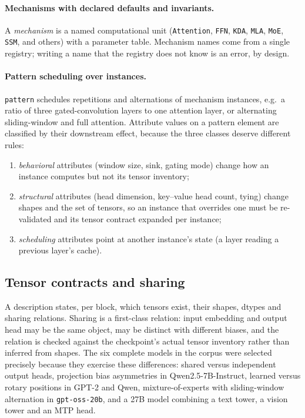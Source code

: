 \documentclass[11pt,a4paper]{article}
\newcommand{\code}[1]{\texttt{#1}}
\begin{document}
\paragraph{Mechanisms with declared defaults and invariants.}
A \emph{mechanism} is a named computational unit (\code{Attention},
\code{FFN}, \code{KDA}, \code{MLA}, \code{MoE}, \code{SSM}, and others) with a
parameter table. Mechanism names come from a single registry; writing a name
that the registry does not know is an error, by design.

\paragraph{Pattern scheduling over instances.}
\code{pattern} schedules repetitions and alternations of mechanism instances,
e.g.\ a ratio of three gated-convolution layers to one attention layer, or
alternating sliding-window and full attention. Attribute values on a pattern
element are classified by their downstream effect, because the three classes
deserve different rules:
\begin{enumerate}
  \item \emph{behavioral} attributes (window size, sink, gating mode) change
  how an instance computes but not its tensor inventory;
  \item \emph{structural} attributes (head dimension, key--value head count,
  tying) change shapes and the set of tensors, so an instance that overrides
  one must be re-validated and its tensor contract expanded per instance;
  \item \emph{scheduling} attributes point at another instance's state
  (a layer reading a previous layer's cache).
\end{enumerate}

\subsection{Tensor contracts and sharing}

A description states, per block, which tensors exist, their shapes, dtypes and
sharing relations. Sharing is a first-class relation: input embedding and
output head may be the same object, may be distinct with different biases, and
the relation is checked against the checkpoint's actual tensor inventory
rather than inferred from shapes. The six complete models in the corpus were
selected precisely because they exercise these differences: shared versus
independent output heads, projection bias asymmetries in Qwen2.5-7B-Instruct,
learned versus rotary positions in GPT-2 and Qwen, mixture-of-experts with
sliding-window alternation in \code{gpt-oss-20b}, and a 27B model combining a
text tower, a vision tower and an MTP head.
\end{document}
